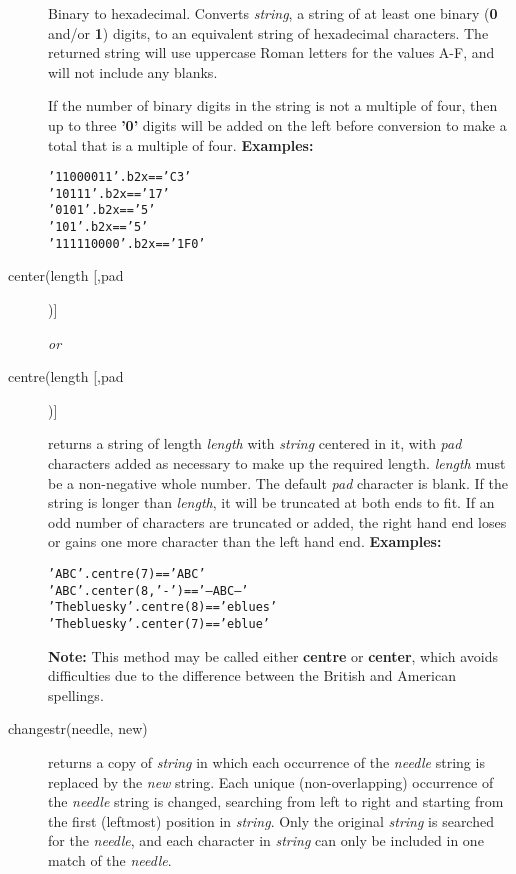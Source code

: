 \begin{description}
Binary to hexadecimal.
Converts \emph{string}, a string of at least one binary
(\textbf{0} and/or \textbf{1}) digits, to an equivalent string of
hexadecimal characters.
The returned string will use uppercase Roman letters for the values A-F,
and will not include any blanks.
 
If the number of binary digits in the string is not a multiple of four,
then up to three \textbf{'0'} digits will be added on the left before
conversion to make a total that is a multiple of four.
 \textbf{Examples:}
\begin{alltt}
'11000011'.b2x  == 'C3'
'10111'.b2x     == '17'
'0101'.b2x      == '5'
'101'.b2x       == '5'
'111110000'.b2x == '1F0'
\end{alltt}
  
\item[center(length [,pad])]\label{refcenter}

\emph{or}
\item[centre(length [,pad])]\label{refcentre}

returns a string of length \emph{length} with \emph{string}
centered in it, with \emph{pad} characters added as necessary to
make up the required length.
\emph{length} must be a non-negative whole number.
The default \emph{pad} character is blank.
If the string is longer than \emph{length}, it will be truncated at
both ends to fit.
If an odd number of characters are truncated or added, the right hand
end loses or gains one more character than the left hand end.
 \textbf{Examples:}
\begin{alltt}
'ABC'.centre(7)          == '  ABC  '
'ABC'.center(8,'-')      == '--ABC---'
'The blue sky'.centre(8) == 'e blue s'
'The blue sky'.center(7) == 'e blue '
\end{alltt}
\textbf{Note: }This method may be called either \textbf{centre} or \textbf{center},
which avoids difficulties due to the difference between the British and
American spellings.
\item[changestr(needle, new)]\label{refchastr}

returns a copy of \emph{string} in which each occurrence of the
\emph{needle} string is replaced by the \emph{new} string.
Each unique (non-overlapping) occurrence of the \emph{needle} string
is changed, searching from left to right and starting from the first
(leftmost) position in \emph{string}.
Only the original \emph{string} is searched for the
\emph{needle}, and each character in \emph{string} can only be
included in one match of the \emph{needle}.
 

\end{description}
